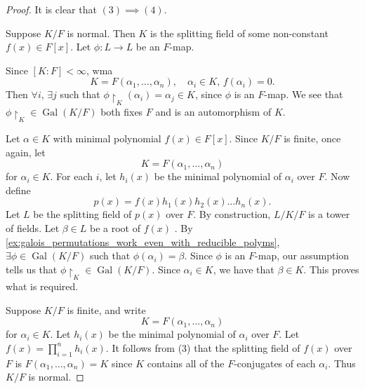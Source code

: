 \documentclass[notoc,notitlepage,nobib]{tufte-book}
\DeclareMathOperator{\Gal}{Gal}
\begin{document}
\begin{proof}
  It is clear that $(3) \implies (4)$.

  \noindent
   Suppose $K / F$ is normal. Then $K$ is the
  splitting field of some non-constant $f(x) \in F[x]$. Let $\phi : L \to L$ be
  an $F$-map.

  Since $[ K : F ] < \infty$, wma
  \begin{equation*}
    K = F(\alpha_1, \ldots, \alpha_n), \quad \alpha_i \in K, \, f(\alpha_i) = 0.
  \end{equation*}
  Then $\forall i$, $\exists j$ such that $\phi \restriction_K (\alpha_i) =
  \alpha_j \in K$, since $\phi$ is an $F$-map. We see that $\phi \restriction_K
  \in \Gal(K / F)$ both fixes $F$ and is an automorphism of $K$.

  \noindent
   Let $\alpha \in K$ with minimal polynomial $f(x)
  \in F[x]$. Since $K / F$ is finite, once again, let
  \begin{equation*}
    K = F(\alpha_1, \ldots, \alpha_n)
  \end{equation*}
  for $\alpha_i \in K$. For each $i$, let $h_i(x)$ be the minimal polynomial of
  $\alpha_i$ over $F$. Now define 
  \begin{equation*}
    p(x) = f(x) h_1(x) h_2(x) \hdots h_n(x).
  \end{equation*}
  Let $L$ be the splitting field of $p(x)$ over $F$. By construction, $L / K /
  F$ is a tower of fields. Let $\beta \in L$ be a root of $f(x)$ . By
  \cref{ex:galois_permutations_work_even_with_reducible_polyms}, $\exists \phi
  \in \Gal(K / F)$ such that $\phi(\alpha_i) = \beta$. Since $\phi$ is an
  $F$-map, our assumption tells us that $\phi \restriction_K \in \Gal(K / F)$.
  Since $\alpha_i \in K$, we have that $\beta \in K$. This proves what is
  required.

  \noindent
   Suppose $K / F$ is finite, and write
  \begin{equation*}
    K = F(\alpha_1, \ldots, \alpha_n)
  \end{equation*}
  for $\alpha_i \in K$. Let $h_i(x)$ be the minimal polynomial of $\alpha_i$
  over $F$. Let $f(x) = \prod_{i=1}^{n} h_i(x)$. It follows from (3) that the
  splitting field of $f(x)$ over $F$ is $F(\alpha_1, \ldots, \alpha_n) = K$
  since $K$ contains all of the $F$-conjugates of each $\alpha_i$. Thus $K / F$
  is normal.
\end{proof}
\end{document}
